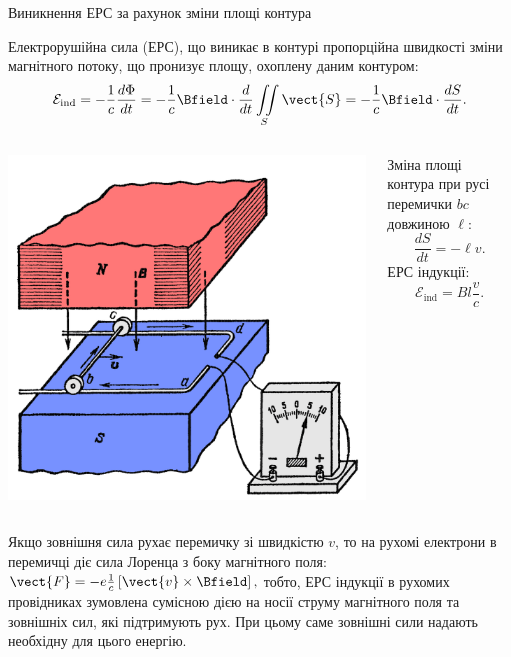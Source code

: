 \documentclass[onlytextwidth]{beamer}
\begin{document}
\begin{frame}{Виникнення ЕРС за рахунок зміни площі контура}{}\small
	\begin{block}{}\justifying
		Електрорушійна сила (ЕРС), що виникає в контурі пропорційна швидкості зміни магнітного потоку, що пронизує площу, охоплену даним контуром:
		\begin{equation*}
			\mathcal{E}_\text{ind} =  -\frac1c \frac{d\Phi}{dt} = -\frac1c \Bfield\cdot \frac{d}{dt} \iint\limits_S \vect{S} = -\frac1c \Bfield\cdot
			\frac{dS}{dt}.
		\end{equation*}
	\end{block}
	\begin{columns}
		\begin{column}{0.4\linewidth}\centering
			\begin{pict}
				\includegraphics[width=0.85\linewidth]{Area_change}
			\end{pict}
		\end{column}
		\begin{column}{0.6\linewidth}
			\begin{block}{}\justifying
				Зміна площі контура при русі перемички $bc$ довжиною $\ell$:
				\begin{equation*}
					\frac{dS}{dt} = -\ell v.
				\end{equation*}
				ЕРС індукції:
				\begin{equation*}
					\mathcal{E}_\text{ind} = Bl\frac{v}{c}.
				\end{equation*}
			\end{block}
		\end{column}
	\end{columns}
	\begin{block}{}\justifying
		Якщо зовнішня сила рухає перемичку зі швидкістю $v$, то на рухомі електрони в перемичці діє сила Лоренца з боку магнітного поля:
		\(
		\vect{F} = -e\frac1c\left[\vect{v}\times\Bfield\right],
		\)
		тобто, ЕРС індукції в рухомих провідниках зумовлена сумісною дією на носії струму магнітного поля та зовнішніх сил, які підтримують рух. При
		цьому саме зовнішні сили надають необхідну для цього енергію.
	\end{block}
\end{frame}
\end{document}
